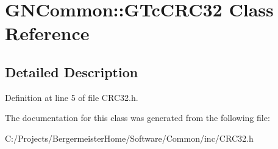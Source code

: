 \hypertarget{class_g_n_common_1_1_g_tc_c_r_c32}{}\section{G\+N\+Common\+:\+:G\+Tc\+C\+R\+C32 Class Reference}
\label{class_g_n_common_1_1_g_tc_c_r_c32}


\subsection{Detailed Description}


Definition at line 5 of file C\+R\+C32.\+h.



The documentation for this class was generated from the following file\+:\begin{DoxyCompactItemize}
\item 
C\+:/\+Projects/\+Bergermeister\+Home/\+Software/\+Common/inc/C\+R\+C32.\+h\end{DoxyCompactItemize}
